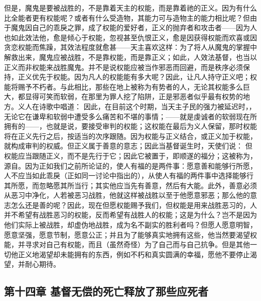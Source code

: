 但是，魔鬼是要被战胜的，不是靠着天主的权能，而是靠着祂的正义。因为有什么比全能者更有权能呢？或者有什么受造物，其能力可与造物主的能力相比呢？但由于魔鬼因自己的乖戾之罪，成了权能的爱好者，正义的抛弃者和攻击者——因为人也如此效法他，愈是倾心于权能，忽视甚至仇恨正义，愈是因获得权能而欢喜或因贪恋权能而焦躁，其效法程度就愈甚——天主喜欢这样：为了将人从魔鬼的掌握中解救出来，魔鬼应被战胜，不是靠权能，而是靠正义；如此，人效法基督，也当以正义而非权能来战胜魔鬼。并不是说权能应被当作邪恶而回避，而是秩序必须保持，正义优先于权能。因为凡人的权能能有多大呢？因此，让凡人持守正义吧；权能将赐予不朽者。与此相比，那些在地上被称为有势者的人，无论其权能多么巨大，都显得可笑而软弱，在那里为罪人挖了陷阱，正是邪恶者似乎最有权势的地方。义人在诗歌中唱道： 因此，在目前这个时期，当天主子民的强力被延迟时，，无论它在谦卑和软弱中遭受多么痛苦和不堪的事情；——就是虔诚者的软弱现在所拥有的——，也就是说，要接受审判的权能；这权能在最后为义人保留，那时权能将在正义先行之后，按适当的次序跟随。因为权能与正义结合，或正义加于权能，就构成审判的权威。但正义属于善意的意志；因此当基督诞生时，天使们说： 但权能应当跟随正义，而不是先行于它；因此它被置于，即顺遂的福分；这被称为，源自。因为正如我们之前所论证的，使人有福的是两件事：愿意善和能够行所愿，人不应当如此乖戾（正如同一讨论中指出的），从使人有福的两件事中选择能够行其所愿，而忽略愿其所当行；其实他应当先有善意，然后有大能。此外，善意必须从恶习中净化，人若被恶习战胜，他就这样被战胜以至于他愿意邪恶；那么他的意志怎么还是善的呢？因此，现在但愿权能赐予我们，但权能是用来战胜恶习的，人并不希望有战胜恶习的权能，反而希望有战胜人的权能；这是为什么？岂不是因为他们实际上被战胜，却虚伪地战胜，成为名不副实的胜利者吗？但愿人愿意明智，愿意坚强，愿意节制，愿意公正；并且为了能够真实地拥有这些，他当然要渴望权能，并寻求对自己有权能，而且（虽然奇怪）为了自己而与自己抗争。但是其他一切他正义地渴望却未能拥有的东西，例如不朽和真实圆满的幸福，愿他不要停止渴望，并耐心期待。\par


\subsection{第十四章 基督无偿的死亡释放了那些应死者}

